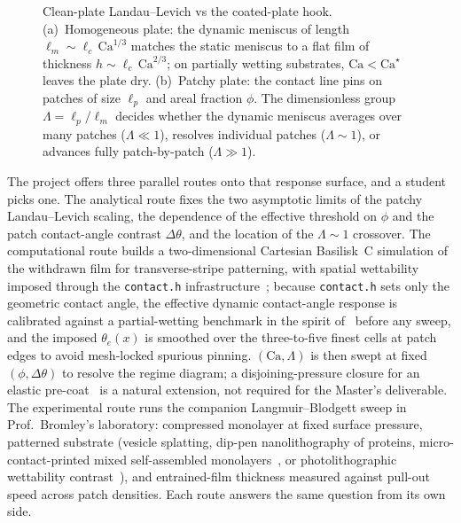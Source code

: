 \documentclass[11pt]{article}
\begin{document}
\begin{figure}[H]
\begin{center}
        \caption{Clean-plate Landau--Levich vs the coated-plate hook. (a)~Homogeneous plate: the dynamic meniscus of length $\ell_m \sim \ell_c \, \mathrm{Ca}^{1/3}$ matches the static meniscus to a flat film of thickness $h \sim \ell_c \, \mathrm{Ca}^{2/3}$; on partially wetting substrates, $\mathrm{Ca} < \mathrm{Ca}^\star$ leaves the plate dry. (b)~Patchy plate: the contact line pins on patches of size $\ell_p$ and areal fraction $\phi$. The dimensionless group $\Lambda = \ell_p / \ell_m$ decides whether the dynamic meniscus averages over many patches ($\Lambda \ll 1$), resolves individual patches ($\Lambda \sim 1$), or advances fully patch-by-patch ($\Lambda \gg 1$).}
        \label{fig:mechanism}
    \end{center}
\end{figure}

The project offers three parallel routes onto that response surface, and a student picks one. The analytical route fixes the two asymptotic limits of the patchy Landau--Levich scaling, the dependence of the effective threshold on $\phi$ and the patch contact-angle contrast $\Delta\theta$, and the location of the $\Lambda \sim 1$ crossover. The computational route builds a two-dimensional Cartesian Basilisk~C simulation of the withdrawn film for transverse-stripe patterning, with spatial wettability imposed through the \texttt{contact.h} infrastructure~\citep{popinet2015quadtree,basiliskVatsal,basiliskVatsalDropFilm}; because \texttt{contact.h} sets only the geometric contact angle, the effective dynamic contact-angle response is calibrated against a partial-wetting benchmark in the spirit of~\citet{afkhami2009,afkhami2018} before any sweep, and the imposed $\theta_e(x)$ is smoothed over the three-to-five finest cells at patch edges to avoid mesh-locked spurious pinning. $(\mathrm{Ca}, \Lambda)$ is then swept at fixed $(\phi, \Delta\theta)$ to resolve the regime diagram; a disjoining-pressure closure for an elastic pre-coat~\citep{bertin2022} is a natural extension, not required for the Master's deliverable. The experimental route runs the companion Langmuir--Blodgett sweep in Prof.~Bromley's laboratory: compressed monolayer at fixed surface pressure, patterned substrate (vesicle splatting, dip-pen nanolithography of proteins, micro-contact-printed mixed self-assembled monolayers~\citep{wilbur1994,mrksich1995}, or photolithographic wettability contrast~\citep{darhuber2000}), and entrained-film thickness measured against pull-out speed across patch densities. Each route answers the same question from its own side.
\end{document}
